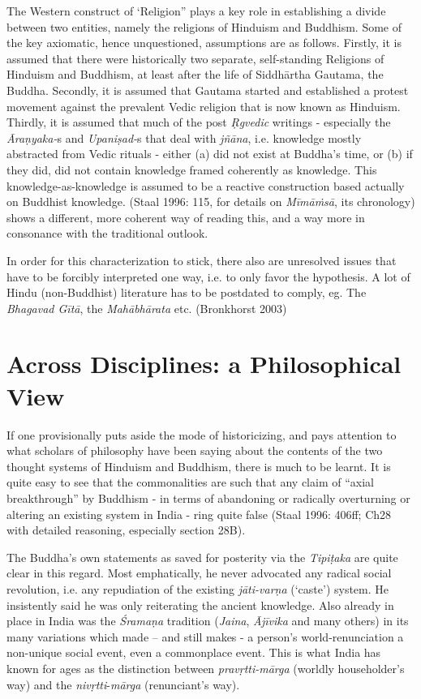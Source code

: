 The Western construct of ‘Religion” plays a key role in establishing a divide between two entities, namely the religions of Hinduism and Buddhism. Some of the key axiomatic, hence unquestioned, assumptions are as follows. Firstly, it is assumed that there were historically two separate, self-standing Religions of Hinduism and Buddhism, at least after the life of Siddhārtha Gautama, the Buddha. Secondly, it is assumed that Gautama started and established a protest movement against the prevalent Vedic religion that is now known as Hinduism. Thirdly, it is assumed that much of the post \textit{Ṛgvedic} writings - especially the \textit{Āraṇyaka-}s and \textit{Upaniṣad-}s that deal with \textit{jñāna}, i.e. knowledge mostly abstracted from Vedic rituals - either (a) did not exist at Buddha’s time, or (b) if they did, did not contain knowledge framed coherently as knowledge. This knowledge-as-knowledge is assumed to be a reactive construction based actually on Buddhist knowledge. (Staal 1996: 115, for details on \textit{Mīmāṁsā}, its chronology) shows a different, more coherent way of reading this, and a way more in consonance with the traditional outlook.

In order for this characterization to stick, there also are unresolved issues that have to be forcibly interpreted one way, i.e. to only favor the hypothesis. A lot of Hindu (non-Buddhist) literature has to be postdated to comply, eg. The \textit{Bhagavad Gītā}, the \textit{Mahābhārata} etc. (Bronkhorst 2003)


\section*{Across Disciplines: a Philosophical View}

If one provisionally puts aside the mode of historicizing, and pays attention to what scholars of philosophy have been saying about the contents of the two thought systems of Hinduism and Buddhism, there is much to be learnt. It is quite easy to see that the commonalities are such that any claim of “axial breakthrough” by Buddhism - in terms of abandoning or radically overturning or altering an existing system in India - ring quite false (Staal 1996: 406ff; Ch28 with detailed reasoning, especially section 28B).

The Buddha’s own statements as saved for posterity via the \textit{Tipiṭaka} are quite clear in this regard. Most emphatically, he never advocated any radical social revolution, i.e. any repudiation of the existing \textit{jāti-varṇa} (‘caste’) system. He insistently said he was only reiterating the ancient knowledge. Also already in place in India was the \textit{Śramaṇa} tradition (\textit{Jaina}, \textit{Ājīvika} and many others) in its many variations which made – and still makes - a person’s world-renunciation a non-unique social event, even a commonplace event. This is what India has known for ages as the distinction between \textit{pravṛtti-mārga} (worldly householder’s way) and the \textit{nivṛtti}-\textit{mārga} (renunciant’s way).


